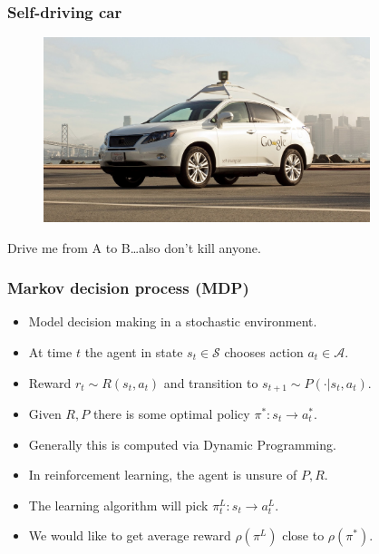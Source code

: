 \documentclass{beamer}
\newlength{\wideitemsep}
\let\olditem\item
\renewcommand{\item}{\setlength{\itemsep}{\wideitemsep}\olditem}
\newcommand{\Sc}{\mathcal{S}}
\newcommand{\Ac}{\mathcal{A}}
\begin{document}
\begin{frame}
\frametitle{Self-driving car}
\begin{figure}
\includegraphics[width=0.85\textwidth]{./media/selfCar}
\end{figure}
\centering
Drive me from A to B\pause\dots also don't kill anyone.
\end{frame}

\begin{frame}
\frametitle{Markov decision process (MDP)}

\begin{itemize}
	\item Model decision making in a stochastic environment.
	\item At time $t$ the agent in state $s_t \in \Sc$ chooses action $a_t \in \Ac$.
	\item Reward $r_t \sim R(s_t,a_t)$ and transition to $s_{t+1} \sim P(\cdot | s_t,a_t)$.
	\item Given $R,P$ there is some optimal policy $\pi^*:s_t \rightarrow a^*_t$.
	\item Generally this is computed via Dynamic Programming.
	\pause
	\vspace{8mm}
	\item In reinforcement learning, the agent is unsure of $P,R$.
	\item The learning algorithm will pick $\pi^L_t : s_t \rightarrow a_t^L$.
	\item We would like to get average reward $\rho(\pi^L)$ close to $\rho(\pi^*)$.
\end{itemize}
\end{frame}


\end{document}
